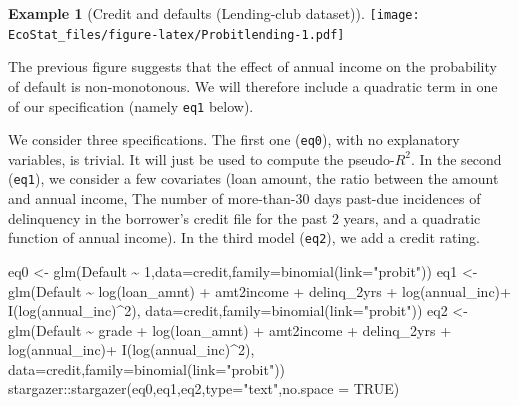 \documentclass[
  12pt,
]{book}
\newenvironment{Shaded}{\begin{snugshade}}{\end{snugshade}}
\newcommand{\AttributeTok}[1]{\textcolor[rgb]{0.77,0.63,0.00}{#1}}
\newcommand{\ConstantTok}[1]{\textcolor[rgb]{0.00,0.00,0.00}{#1}}
\newcommand{\DecValTok}[1]{\textcolor[rgb]{0.00,0.00,0.81}{#1}}
\newcommand{\FunctionTok}[1]{\textcolor[rgb]{0.00,0.00,0.00}{#1}}
\newcommand{\NormalTok}[1]{#1}
\newcommand{\OtherTok}[1]{\textcolor[rgb]{0.56,0.35,0.01}{#1}}
\newcommand{\SpecialCharTok}[1]{\textcolor[rgb]{0.00,0.00,0.00}{#1}}
\newcommand{\StringTok}[1]{\textcolor[rgb]{0.31,0.60,0.02}{#1}}
\theoremstyle{definition}
\theoremstyle{definition}
\newtheorem{example}{Example}[chapter]
\theoremstyle{definition}
\theoremstyle{definition}
\theoremstyle{remark}
\begin{document}
\begin{example}[Credit and defaults (Lending-club dataset)]
\texttt{[image: EcoStat\_files/figure-latex/Probitlending-1.pdf]}

The previous figure suggests that the effect of annual income on the probability of default is non-monotonous. We will therefore include a quadratic term in one of our specification (namely \texttt{eq1} below).

We consider three specifications. The first one (\texttt{eq0}), with no explanatory variables, is trivial. It will just be used to compute the pseudo-\(R^2\). In the second (\texttt{eq1}), we consider a few covariates (loan amount, the ratio between the amount and annual income, The number of more-than-30 days past-due incidences of delinquency in the borrower's credit file for the past 2 years, and a quadratic function of annual income). In the third model (\texttt{eq2}), we add a credit rating.

\begin{Shaded}
\begin{Highlighting}[]
\NormalTok{eq0 }\OtherTok{\textless{}{-}} \FunctionTok{glm}\NormalTok{(Default }\SpecialCharTok{\textasciitilde{}} \DecValTok{1}\NormalTok{,}\AttributeTok{data=}\NormalTok{credit,}\AttributeTok{family=}\FunctionTok{binomial}\NormalTok{(}\AttributeTok{link=}\StringTok{"probit"}\NormalTok{))}
\NormalTok{eq1 }\OtherTok{\textless{}{-}} \FunctionTok{glm}\NormalTok{(Default }\SpecialCharTok{\textasciitilde{}} \FunctionTok{log}\NormalTok{(loan\_amnt) }\SpecialCharTok{+}\NormalTok{ amt2income }\SpecialCharTok{+}\NormalTok{ delinq\_2yrs }\SpecialCharTok{+} 
             \FunctionTok{log}\NormalTok{(annual\_inc)}\SpecialCharTok{+} \FunctionTok{I}\NormalTok{(}\FunctionTok{log}\NormalTok{(annual\_inc)}\SpecialCharTok{\^{}}\DecValTok{2}\NormalTok{),}
           \AttributeTok{data=}\NormalTok{credit,}\AttributeTok{family=}\FunctionTok{binomial}\NormalTok{(}\AttributeTok{link=}\StringTok{"probit"}\NormalTok{))}
\NormalTok{eq2 }\OtherTok{\textless{}{-}} \FunctionTok{glm}\NormalTok{(Default }\SpecialCharTok{\textasciitilde{}}\NormalTok{ grade }\SpecialCharTok{+} \FunctionTok{log}\NormalTok{(loan\_amnt) }\SpecialCharTok{+}\NormalTok{ amt2income }\SpecialCharTok{+}\NormalTok{ delinq\_2yrs }\SpecialCharTok{+} 
             \FunctionTok{log}\NormalTok{(annual\_inc)}\SpecialCharTok{+} \FunctionTok{I}\NormalTok{(}\FunctionTok{log}\NormalTok{(annual\_inc)}\SpecialCharTok{\^{}}\DecValTok{2}\NormalTok{),}
           \AttributeTok{data=}\NormalTok{credit,}\AttributeTok{family=}\FunctionTok{binomial}\NormalTok{(}\AttributeTok{link=}\StringTok{"probit"}\NormalTok{))}
\NormalTok{stargazer}\SpecialCharTok{::}\FunctionTok{stargazer}\NormalTok{(eq0,eq1,eq2,}\AttributeTok{type=}\StringTok{"text"}\NormalTok{,}\AttributeTok{no.space =} \ConstantTok{TRUE}\NormalTok{)}
\end{Highlighting}
\end{Shaded}


\end{example}
\end{document}
